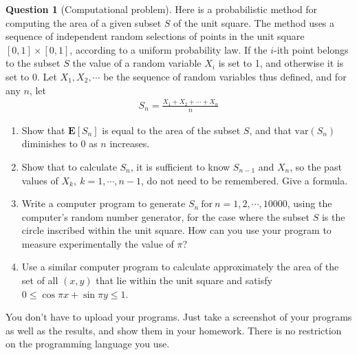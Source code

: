 \documentclass[utf8]{article}
\theoremstyle{definition}%
\newtheorem{question}{Question} %
\theoremstyle{plain}%
\begin{document}
\begin{question}[Computational problem]
    Here is a probabilistic method for computing the area of a given subset $S$ of the unit square. The method uses a sequence of independent random selections of points in the unit square $[0, 1] \times [0, 1]$, according to a uniform probability law. If the $i$-ith point belongs to the subset $S$ the value of a random variable $X_i$ is set to 1, and otherwise it is set to 0. Let $X_1, X_2, \cdots$ be the sequence of random variables thus defined, and for any $n$, let
    \begin{align}
        S_n = \frac{X_1 + X_2 + \cdots + X_n}{n}
    \end{align}
    \begin{enumerate}[label=(\alph*)]
        \item Show that $\mathbf{E}[S_n]$ is equal to the area of the subset $S$, and that $\text{var}(S_n)$ diminishes to 0 as $n$ increases.
        \item Show that to calculate $S_n$, it is sufficient to know $S_{n-1}$ and $X_n$, so the past values of $X_k,~k=1,\cdots,n-1$, do not need to be remembered. Give a formula.
        \item Write a computer program to generate $S_n~\text{for}~n = 1, 2, \cdots, 10000$, using the computer's random number generator, for the case where the subset $S$ is the circle inscribed within the unit square. How can you use your program to measure experimentally the value of $\pi$?
        \item Use a similar computer program to calculate approximately the area of the set of all $(x,y)$ that lie within the unit square and satisfy $0 \leq \cos\pi x + \sin\pi y \leq 1$.
    \end{enumerate}
    You don't have to upload your programs. Just take a screenshot of your programs as well as the results, and show them in your homework. There is no restriction on the programming language you use.
\end{question}
\end{document}
